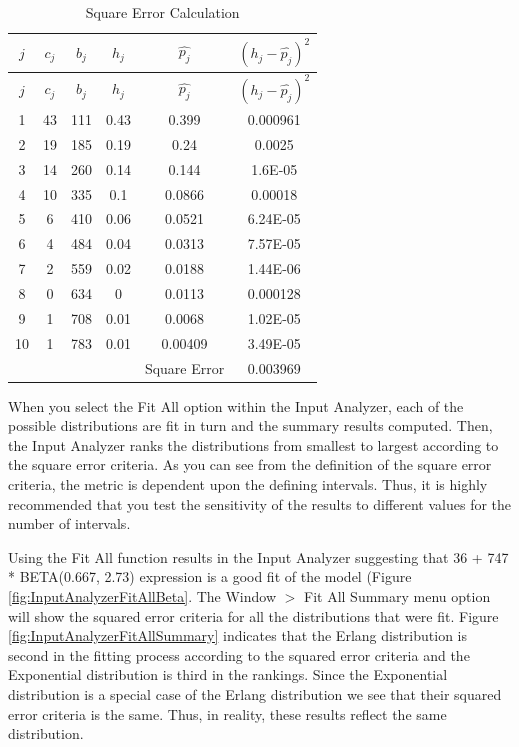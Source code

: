 \documentclass[
]{book}
\theoremstyle{definition}
\theoremstyle{definition}
\theoremstyle{definition}
\theoremstyle{definition}
\theoremstyle{remark}
\begin{document}
\hypertarget{tab:SqErrorCalc}{}
\begin{longtable}[]{@{}cccccc@{}}
\caption{\label{tab:SqErrorCalc} Square Error Calculation}\tabularnewline
\toprule
\(j\) & \(c_j\) & \(b_j\) & \(h_j\) & \(\hat{p_j}\) & \((h_j - \hat{p_j})^2\) \\
\midrule
\endfirsthead
\toprule
\(j\) & \(c_j\) & \(b_j\) & \(h_j\) & \(\hat{p_j}\) & \((h_j - \hat{p_j})^2\) \\
\midrule
\endhead
1 & 43 & 111 & 0.43 & 0.399 & 0.000961 \\
2 & 19 & 185 & 0.19 & 0.24 & 0.0025 \\
3 & 14 & 260 & 0.14 & 0.144 & 1.6E-05 \\
4 & 10 & 335 & 0.1 & 0.0866 & 0.00018 \\
5 & 6 & 410 & 0.06 & 0.0521 & 6.24E-05 \\
6 & 4 & 484 & 0.04 & 0.0313 & 7.57E-05 \\
7 & 2 & 559 & 0.02 & 0.0188 & 1.44E-06 \\
8 & 0 & 634 & 0 & 0.0113 & 0.000128 \\
9 & 1 & 708 & 0.01 & 0.0068 & 1.02E-05 \\
10 & 1 & 783 & 0.01 & 0.00409 & 3.49E-05 \\
& & & & Square Error & 0.003969 \\
\bottomrule
\end{longtable}

When you select the Fit All option within the Input Analyzer, each of the
possible distributions are fit in turn and the summary results computed.
Then, the Input Analyzer ranks the distributions from smallest to
largest according to the square error criteria. As you can see from the
definition of the square error criteria, the metric is dependent upon
the defining intervals. Thus, it is highly recommended that you test the
sensitivity of the results to different values for the number of
intervals.

Using the Fit All function results in the Input Analyzer suggesting that
36 + 747 * BETA(0.667, 2.73) expression is a good fit of the model (Figure \ref{fig:InputAnalyzerFitAllBeta}. The Window \(>\) Fit All Summary menu option will show the squared error
criteria for all the distributions that were fit. Figure \ref{fig:InputAnalyzerFitAllSummary} indicates that the Erlang distribution is second in the fitting process
according to the squared error criteria and the Exponential distribution is third in the rankings. Since the Exponential distribution is a special case of the Erlang distribution we see that their squared error criteria is the same. Thus, in reality, these results reflect the same distribution.
\end{document}
